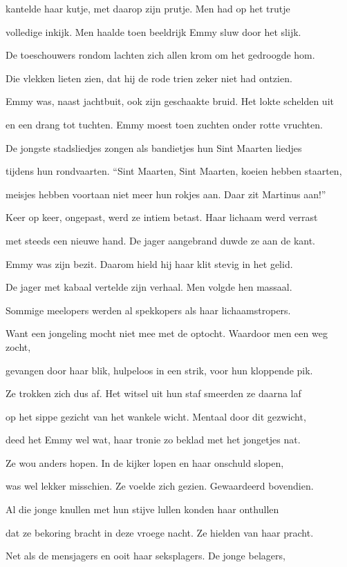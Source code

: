 kantelde haar kutje,
met daarop zijn prutje.
Men had op het trutje

volledige inkijk.
Men haalde toen beeldrijk
Emmy sluw door het slijk.

De toeschouwers rondom
lachten zich allen krom
om het gedroogde hom.

Die vlekken lieten zien,
dat hij de rode trien
zeker niet had ontzien.

Emmy was, naast jachtbuit,
ook zijn geschaakte bruid.
Het lokte schelden uit

en een drang tot tuchten.
Emmy moest toen zuchten
onder rotte vruchten.

De jongste stadsliedjes
zongen als bandietjes
hun Sint Maarten liedjes

tijdens hun rondvaarten.
“Sint Maarten, Sint Maarten,
koeien hebben staarten,

meisjes hebben voortaan
niet meer hun rokjes aan.
Daar zit Martinus aan!”

Keer op keer, ongepast,
werd ze intiem betast.
Haar lichaam werd verrast

met steeds een nieuwe hand.
De jager aangebrand
duwde ze aan de kant.

Emmy was zijn bezit.
Daarom hield hij haar klit
stevig in het gelid.

De jager met kabaal
vertelde zijn verhaal.
Men volgde hen massaal.

Sommige meelopers
werden al spekkopers
als haar lichaamstropers.

Want een jongeling mocht
niet mee met de optocht.
Waardoor men een weg zocht,

gevangen door haar blik,
hulpeloos in een strik,
voor hun kloppende pik.

Ze trokken zich dus af.
Het witsel uit hun staf
smeerden ze daarna laf

op het sippe gezicht
van het wankele wicht.
Mentaal door dit gezwicht,

deed het Emmy wel wat,
haar tronie zo beklad
met het jongetjes nat.

Ze wou anders hopen.
In de kijker lopen
en haar onschuld slopen,

was wel lekker misschien.
Ze voelde zich gezien.
Gewaardeerd bovendien.

Al die jonge knullen
met hun stijve lullen
konden haar onthullen

dat ze bekoring bracht
in deze vroege nacht.
Ze hielden van haar pracht.

Net als de mensjagers
en ooit haar seksplagers.
De jonge belagers,

